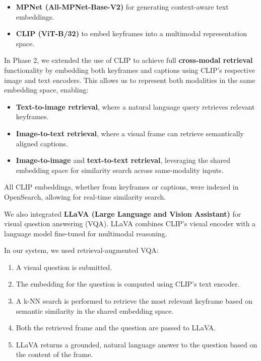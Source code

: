 \documentclass[runningheads]{llncs}
\begin{document}
\begin{itemize}
    \item \textbf{MPNet (All-MPNet-Base-V2)} for generating context-aware text embeddings.
    \item \textbf{CLIP (ViT-B/32)} to embed keyframes into a multimodal representation space.
\end{itemize}

In Phase 2, we extended the use of CLIP to achieve full \textbf{cross-modal retrieval} functionality by embedding both keyframes and captions using CLIP’s respective image and text encoders. This allows us to represent both modalities in the same embedding space, enabling:

\begin{itemize}
    \item \textbf{Text-to-image retrieval}, where a natural language query retrieves relevant keyframes.

    \item \textbf{Image-to-text retrieval}, where a visual frame can retrieve semantically aligned captions.

    \item \textbf{Image-to-image} and \textbf{text-to-text retrieval}, leveraging the shared embedding space for similarity search across same-modality inputs.
\end{itemize}

All CLIP embeddings, whether from keyframes or captions, were indexed in OpenSearch, allowing for real-time similarity search.

We also integrated \textbf{LLaVA (Large Language and Vision Assistant)} for visual question answering (VQA). LLaVA combines CLIP’s visual encoder with a language model fine-tuned for multimodal reasoning.

In our system, we used retrieval-augmented VQA:

\begin{enumerate}
    \item A visual question is submitted.

    \item The embedding for the question is computed using CLIP's text encoder.

    \item A k-NN search is performed to retrieve the most relevant keyframe based on semantic similarity in the shared embedding space.

    \item Both the retrieved frame and the question are passed to LLaVA.

    \item LLaVA returns a grounded, natural language answer to the question based on the content of the frame.
\end{enumerate}
\end{document}
